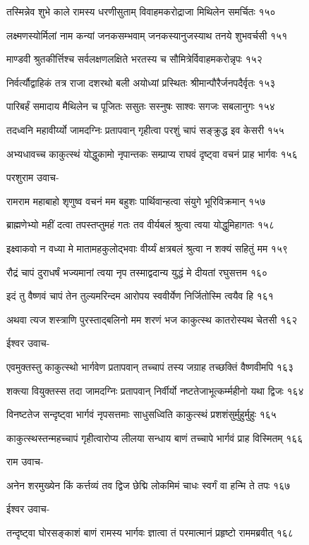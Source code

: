 तस्मिन्नेव शुभे काले रामस्य धरणीसुताम्
विवाहमकरोद्राजा मिथिलेन समर्चितः १५०

लक्ष्मणस्योर्मिलां नाम कन्यां जनकसम्भवाम्
जनकस्यानुजस्याथ तनये शुभवर्चसी १५१

माण्डवी श्रुतकीर्त्तिश्च सर्वलक्षणलक्षिते
भरतस्य च सौमित्रेर्विवाहमकरोन्नृपः १५२

निर्वर्त्यौद्वाहिकं तत्र राजा दशरथो बली
अयोध्यां प्रस्थितः श्रीमान्पौरैर्जनपदैर्वृतः १५३

पारिबर्हं समादाय मैथिलेन च पूजितः
ससुतः सस्नुषः साश्वः सगजः सबलानुगः १५४

तदध्वनि महावीर्य्यो जामदग्निः प्रतापवान्
गृहीत्वा परशुं चापं सङ्क्रुद्ध इव केसरी १५५

अभ्यधावच्च काकुत्स्थं योद्धुकामो नृपान्तकः
सम्प्राप्य राघवं दृष्ट्वा वचनं प्राह भार्गवः १५६

परशुराम उवाच-

रामराम महाबाहो शृणुष्व वचनं मम
बहुशः पार्थिवान्हत्वा संयुगे भूरिविक्रमान् १५७

ब्राह्मणेभ्यो महीं दत्वा तपस्तप्तुमहं गतः
तव वीर्यबलं श्रुत्वा त्वया योद्धुमिहागतः १५८

इक्ष्वाकवो न वध्या मे मातामहकुलोद्भवाः
वीर्य्यं क्षत्रबलं श्रुत्वा न शक्यं सहितुं मम १५९

रौद्रं चापं दुराधर्षं भज्यमानां त्वया नृप
तस्माद्वदान्य युद्धं मे दीयतां रघुसत्तम १६०

इदं तु वैष्णवं चापं तेन तुल्यमरिन्दम
आरोपय स्ववीर्येण निर्जितोस्मि त्वयैव हि १६१

अथवा त्यज शस्त्राणि पुरस्ताद्बलिनो मम
शरणं भज काकुत्स्थ कातरोस्यथ चेतसी १६२

ईश्वर उवाच-

एवमुक्तस्तु काकुत्स्थो भार्गवेण प्रतापवान्
तच्चापं तस्य जग्राह तच्छक्तिं वैष्णवीमपि १६३

शक्त्या वियुक्तस्स तदा जामदग्निः प्रतापवान्
निर्वीर्यो नष्टतेजाभूत्कर्म्महीनो यथा द्विजः १६४

विनष्टतेज सन्दृष्ट्वा भार्गवं नृपसत्तमाः
साधुसध्विति काकुत्स्थं प्रशशंसुर्मुहुर्मुहुः १६५

काकुत्स्थस्तन्महच्चापं गृहीत्वारोप्य लीलया
सन्धाय बाणं तच्चापे भार्गवं प्राह विस्मितम् १६६

राम उवाच-

अनेन शरमुख्येन किं कर्त्तव्यं तव द्विज
छेद्मि लोकमिमं चाधः स्वर्गं वा हन्मि ते तपः १६७

ईश्वर उवाच-

तन्दृष्ट्वा घोरसङ्काशं बाणं रामस्य भार्गवः
ज्ञात्वा तं परमात्मानं प्रहृष्टो राममब्रवीत् १६८

